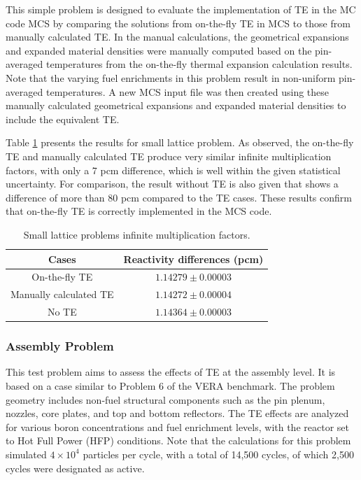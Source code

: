 This simple problem is designed to evaluate the implementation of TE in the MC code MCS by comparing the solutions from on-the-fly TE in MCS to those from manually calculated TE. In the manual calculations, the geometrical expansions and expanded material densities were manually computed based on the pin-averaged temperatures from the on-the-fly thermal expansion calculation results. Note that the varying fuel enrichments in this problem result in non-uniform pin-averaged temperatures. A new MCS input file was then created using these manually calculated geometrical expansions and expanded material densities to include the equivalent TE.

Table \ref{tab42a} presents the results for small lattice problem. As observed, the on-the-fly TE and manually calculated TE produce very similar infinite multiplication factors, with only a 7 pcm difference, which is well within the given statistical uncertainty. For comparison, the result without TE is also given that shows a difference of more than 80 pcm compared to the TE cases. These results confirm that on-the-fly TE is correctly implemented in the MCS code.

\begin{table}
    \centering
    \caption{Small lattice problems infinite multiplication factors.}
    \label{tab42a} 
    \begin{tabular}{| c | c |}
    \hline 
     Cases & Reactivity differences (pcm) \\
     \hline
     On-the-fly TE          & $1.14279\pm0.00003$     \\ \hline
     Manually calculated TE & $1.14272\pm0.00004$    \\ \hline
     No TE                  & $1.14364\pm0.00003$    \\ \hline
    \end{tabular}
\end{table}


\subsubsection{Assembly Problem}

This test problem aims to assess the effects of TE at the assembly level. It is based on a case similar to Problem 6 of the VERA benchmark. The problem geometry includes non-fuel structural components such as the pin plenum, nozzles, core plates, and top and bottom reflectors. The TE effects are analyzed for various boron concentrations and fuel enrichment levels, with the reactor set to Hot Full Power (HFP) conditions. Note that the calculations for this problem simulated $4\times10^4$ particles per cycle, with a total of 14,500 cycles, of which 2,500 cycles were designated as active.

